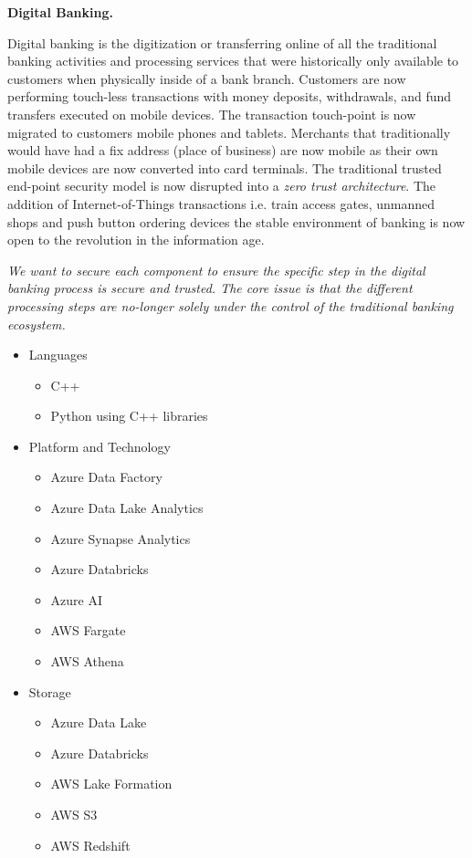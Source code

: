 \begin{Workpackage}{\thewpno}
\begin{Task}
\textbf{Digital Banking.}

Digital banking is the digitization or transferring online of all the traditional banking activities and processing services that were historically only available to customers when physically inside of a bank branch. Customers are now performing touch-less transactions with money deposits, withdrawals, and fund transfers executed on mobile devices. The transaction touch-point is now migrated to customers mobile phones and tablets. Merchants that traditionally would have had a fix address (place of business) are now mobile as their own mobile devices are now converted into card terminals. The traditional trusted end-point security model is now disrupted into a \emph{zero trust architecture}. The addition of Internet-of-Things transactions i.e. train access gates, unmanned shops and push button ordering devices the stable environment of banking is now open to the revolution in the information age.

\emph{We want to secure each component to ensure the specific step in the digital banking process is secure and trusted. The core issue is that the different processing steps are no-longer solely under the control of the traditional banking ecosystem.}

\begin{itemize}
    \item Languages
        \begin{itemize}
            \item C++
            \item Python using C++ libraries
        \end{itemize}
    \item Platform and Technology
        \begin{itemize}
            \item Azure Data Factory
            \item Azure Data Lake Analytics
            \item Azure Synapse Analytics
            \item Azure Databricks
            \item Azure AI
            \item AWS Fargate
            \item AWS Athena
        \end{itemize}
    \item Storage
        \begin{itemize}
            \item Azure Data Lake
            \item Azure Databricks
            \item AWS Lake Formation
            \item AWS S3
            \item AWS Redshift
        \end{itemize}
\end{itemize}


\end{Task}
\end{Workpackage}
